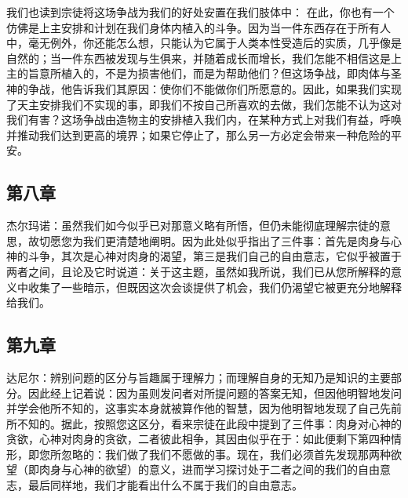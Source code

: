我们也读到宗徒将这场争战为我们的好处安置在我们肢体中：\newline{} 在此，你也有一个仿佛是上主安排和计划在我们身体内植入的斗争。因为当一件东西存在于所有人中，毫无例外，你还能怎么想，只能认为它属于人类本性受造后的实质，几乎像是自然的；当一件东西被发现与生俱来，并随着成长而增长，我们怎能不相信这是上主的旨意所植入的，不是为损害他们，而是为帮助他们？但这场争战，即肉体与圣神的争战，他告诉我们其原因：使你们不能做你们所愿意的。因此，如果我们实现了天主安排我们不实现的事，即我们不按自己所喜欢的去做，我们怎能不认为这对我们有害？这场争战由造物主的安排植入我们内，在某种方式上对我们有益，呼唤并推动我们达到更高的境界；如果它停止了，那么另一方必定会带来一种危险的平安。\par


\subsection{第八章}

\par

杰尔玛诺：虽然我们如今似乎已对那意义略有所悟，但仍未能彻底理解宗徒的意思，故切愿您为我们更清楚地阐明。因为此处似乎指出了三件事：首先是肉身与心神的斗争，其次是心神对肉身的渴望，第三是我们自己的自由意志，它似乎被置于两者之间，且论及它时说道：关于这主题，虽然如我所说，我们已从您所解释的意义中收集了一些暗示，但既因这次会谈提供了机会，我们仍渴望它被更充分地解释给我们。\par


\subsection{第九章}

\par

达尼尔：辨别问题的区分与旨趣属于理解力；而理解自身的无知乃是知识的主要部分。因此经上记着说：因为虽则发问者对所提问题的答案无知，但因他明智地发问并学会他所不知的，这事实本身就被算作他的智慧，因为他明智地发现了自己先前所不知的。据此，按照您这区分，看来宗徒在此段中提到了三件事：肉身对心神的贪欲，心神对肉身的贪欲，二者彼此相争，其因由似乎在于：如此便剩下第四种情形，即您所忽略的：我们做了我们不愿做的事。现在，我们必须首先发现那两种欲望（即肉身与心神的欲望）的意义，进而学习探讨处于二者之间的我们的自由意志，最后同样地，我们才能看出什么不属于我们的自由意志。\par

